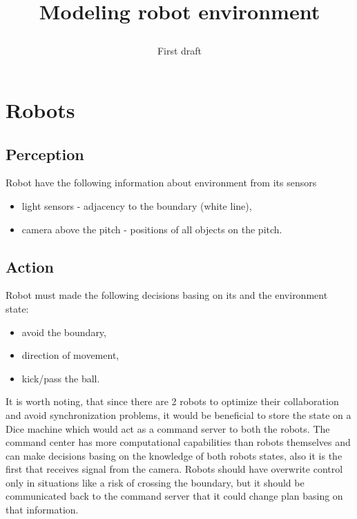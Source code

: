 \documentclass[11pt,a4paper]{article}
\title{\textbf{Modeling robot environment}\subtitle{First draft}}
\author{}
\date{}
\begin{document}
\maketitle

\section{Robots}

\subsection{Perception}
Robot have the following information about environment from its sensors
\begin{itemize}
  \item light sensors - adjacency to the boundary (white line),
  \item camera above the pitch - positions of all objects on the pitch.
\end{itemize}

\subsection{Action}
Robot must made the following decisions basing on its and the environment state:
\begin{itemize}
  \item avoid the boundary,
  \item direction of movement,
  \item kick/pass the ball.
\end{itemize}

It is worth noting, that since there are 2 robots to optimize their collaboration and avoid synchronization problems, it would be beneficial to store the state on a Dice machine which would act as a command server to both the robots. The command center has more computational capabilities than robots themselves and can make decisions basing on the knowledge of both robots states, also it is the first that receives signal from the camera. Robots should have overwrite control only in situations like a risk of crossing the boundary, but it should be communicated back to the command server that it could change plan basing on that information.
\end{document}
